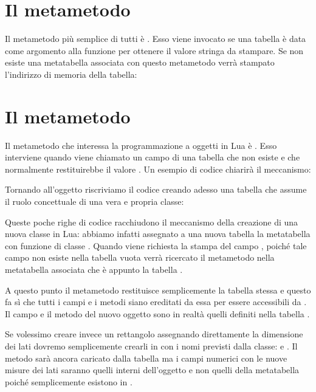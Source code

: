 \section{Il metametodo }

Il metametodo più semplice di tutti è .
Esso viene invocato se una tabella è data come argomento alla funzione
 per ottenere il valore stringa da stampare. Se non
esiste una metatabella associata con questo metametodo verrà stampato
l'indirizzo di memoria della tabella:


\section{Il metametodo }
\label{iiSecMetaIndex}

Il metametodo che interessa la programmazione a oggetti in Lua è
. Esso interviene quando viene chiamato un
campo di una tabella che non esiste e che normalmente restituirebbe il valore
. Un esempio di codice chiarirà il meccanismo:

Tornando all'oggetto  riscriviamo il codice creando adesso una
tabella che assume il ruolo concettuale di una vera e propria classe:

Queste poche righe di codice racchiudono il meccanismo della creazione di una
nuova classe in Lua: abbiamo infatti assegnato a una nuova tabella  la
metatabella con funzione di classe . Quando viene richiesta la
stampa del campo , poiché tale campo non esiste nella tabella vuota
 verrà ricercato il metametodo  nella metatabella
associata che è appunto la tabella .

A questo punto il metametodo restituisce semplicemente la tabella
 stessa e questo fa sì che tutti i campi e i metodi siano
ereditati da essa per essere accessibili da . Il campo  e il
metodo  del nuovo oggetto  sono in realtà quelli definiti nella
tabella .

Se volessimo creare invece un rettangolo assegnando direttamente la dimensione
dei lati dovremo semplicemente crearli in  con i nomi previsti dalla
classe:  e . Il metodo  sarà ancora caricato dalla
tabella  ma i campi numerici con le nuove misure dei lati
saranno quelli interni dell'oggetto  e non quelli della metatabella
poiché semplicemente esistono in .

